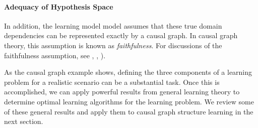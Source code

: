 \documentclass{elsarticle}%
\newcommand{\newtext}{blue}
\def\newtext#1{\textcolor{blue}{#1}}
\begin{document}
\paragraph{Adequacy of Hypothesis Space} In addition, the learning model model assumes that these true domain dependencies can be  represented exactly by a causal graph. In causal graph theory, this assumption is known as {\em faithfulness}. For discussions of the faithfulness assumption, see \cite[Ch.2.4]{pearl00:_causal},
\cite{xiang96:_critic_remar_singl_link_searc}, \cite[Ch.8.1]{studeny05:_probab_condit_indep_struc}).









As the causal graph example shows, defining the three components of a learning problem for  a realistic scenario can be a substantial task. Once this is accomplished, we can apply powerful results from general learning theory to determine optimal learning algorithms for the learning problem. We review some of these general results and apply them to causal graph structure learning in the next section. 
\end{document}
